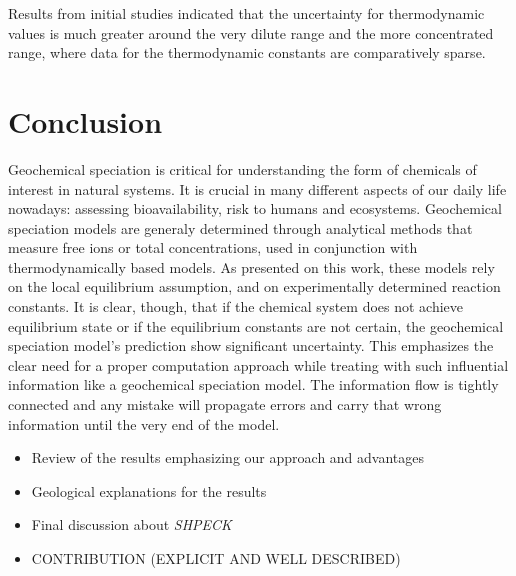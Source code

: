\documentclass[ppgc,mestrado,english]{iiufrgs}
\begin{document}
Results from initial studies indicated that the uncertainty for thermodynamic values is much greater around the very dilute range and the more concentrated range, where data for the thermodynamic constants are comparatively sparse. 


\chapter{Conclusion}

Geochemical speciation is critical for understanding the form of chemicals of interest in natural systems. It is crucial in many different aspects of our daily life nowadays: assessing bioavailability, risk to humans and ecosystems. Geochemical speciation models are generaly determined through analytical methods that measure free ions or total concentrations, used in conjunction with thermodynamically based models. As presented on this work, these models rely on the local equilibrium assumption, and on experimentally determined reaction constants. It is clear, though, that if the chemical system does not achieve equilibrium state or if the equilibrium constants are not certain, the geochemical speciation model's prediction show significant uncertainty.
This emphasizes the clear need for a proper computation approach while treating with such influential information like a geochemical speciation model. The information flow is tightly connected and any mistake will propagate errors and carry that wrong information until the very end of the model.

\begin{itemize}
\item Review of the results emphasizing our approach and advantages
\item  Geological explanations for the results
\item  Final discussion about \emph{SHPECK}
\item  CONTRIBUTION (EXPLICIT AND WELL DESCRIBED) 
\end{itemize}
\end{document}
